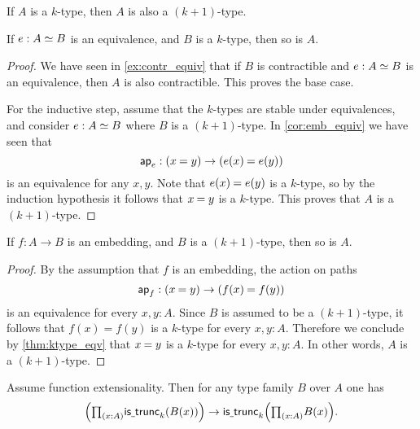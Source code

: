 \begin{lem}\label{thm:istrunc_next}
If $A$ is a $k$-type, then $A$ is also a $(k+1)$-type.
\end{lem}

\begin{thm}\label{thm:ktype_eqv}
If $e:\eqv{A}{B}$ is an equivalence, and $B$ is a $k$-type, then so is $A$.
\end{thm}

\begin{proof}
We have seen in \autoref{ex:contr_equiv} that if $B$ is contractible and $e:\eqv{A}{B}$ is an equivalence, then $A$ is also contractible. This proves the base case.

For the inductive step, assume that the $k$-types are stable under equivalences, and consider $e:\eqv{A}{B}$ where $B$ is a $(k+1)$-type. In \autoref{cor:emb_equiv} we have seen that
\begin{equation*}
\apfunc{e}:(\id{x}{y})\to(\id{e(x)}{e(y)})
\end{equation*}
is an equivalence for any $x,y$. Note that $\id{e(x)}{e(y)}$ is a $k$-type, so by the induction hypothesis it follows that $\id{x}{y}$ is a $k$-type. This proves that $A$ is a $(k+1)$-type.
\end{proof}

\begin{cor}\label{cor:emb_into_ktype}
If $f:A\to B$ is an embedding, and $B$ is a $(k+1)$-type, then so is $A$.
\end{cor}

\begin{proof}
By the assumption that $f$ is an embedding, the action on paths
\begin{equation*}
\apfunc{f}:(\id{x}{y})\to (\id{f(x)}{f(y)})
\end{equation*}
is an equivalence for every $x,y:A$. Since $B$ is assumed to be a $(k+1)$-type, it follows that $f(x)=f(y)$ is a $k$-type for every $x,y:A$. Therefore we conclude by \cref{thm:ktype_eqv} that $\id{x}{y}$ is a $k$-type for every $x,y:A$. In other words, $A$ is a $(k+1)$-type.
\end{proof}

\begin{thm}\label{thm:trunc_pi}
Assume function extensionality. Then for any type family $B$ over $A$ one has
\begin{equation*}
\Big(\prd{x:A}\istrunc{k}(B(x))\Big)\to \istrunc{k}\Big(\prd{x:A}B(x)\Big).
\end{equation*}
\end{thm}

